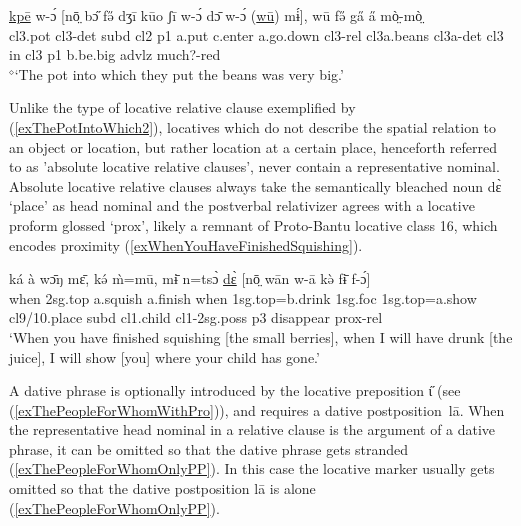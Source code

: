 \documentclass[10pt,twoside]{article}
\def\ci#1{{\ipaFont #1}}
\newcommand{\gl}[1]{`#1'}
\def\VSP{\vspace{0pt}}
\newcommand{\cl}[1]{{\sc cl#1}}
\newcommand{\pref}[1]{(\ref{#1})}
\def\elicited{$^\diamond$}
\def\ih{ɩ}
\begin{document}
\begin{exe}
	\ex \label{exThePotIntoWhich2}	
		\gll \uline{kpē} w-ɔ́ [nō̤ bɔ̋ fə̋ dʒī kūo ʃī w-ɔ́ dɔ̄ w-ɔ́ (\uline{wū}) mɨ́], wū fə̋ ga̋ a̋ mò̤-mò̤	\\
		\cl3.pot \cl3-{\sc det} {\sc subd} \cl2  {\sc p1} a.put c.enter a.go.down \cl3-{\sc rel} \cl3a.beans \cl3a-{\sc det} \cl3  in \cl3  {\sc p1} b.be.big {\sc advlz} much?-{\sc red} 	\\
		\glt \VSP \elicited \gl{The pot into which they put the beans was very big.}
\end{exe}%

Unlike the type of locative relative clause exemplified by \pref{exThePotIntoWhich2}, locatives which do not describe the spatial relation to an object or location, but rather location at a certain place, henceforth referred to as 'absolute locative 
relative clauses', never contain a representative nominal. Absolute locative 
relative clauses always take the semantically bleached noun \ci{dɛ̀} \gl{place} as head nominal and the 
postverbal relativizer agrees with a locative proform glossed \gl{{\sc prox}}, likely
a remnant of Proto-Bantu locative class 16, which 
encodes proximity \pref{exWhenYouHaveFinishedSquishing}. 

\begin{exe}
	\ex \label{exWhenYouHaveFinishedSquishing} 		
		\gll ká à wɔ̄ŋ mɛ̄, kə́ m̀=mū, mɨ̄ n=tsɔ̀ \uline{dɛ̀} [nō̤ wān w-ā kə̀ fɨ̄ f-ɔ́]	\\
		when	{\sc 2sg.top}	a.squish	a.finish		when	{\sc 1sg.top}=b.drink	{\sc 1sg.foc}	{\sc 1sg.top}=a.show	\cl9/10.place	{\sc subd}			\cl1.child		\cl1-{\sc 2sg.poss}	{\sc p3}	disappear	{\sc prox}-{\sc rel}	\\
		\glt \VSP \gl{When you have finished squishing [the small berries], when I will have drunk [the juice], I will show [you] where your child has gone.}
\end{exe}%

A dative phrase is optionally introduced by the locative preposition \ci{\H\ih} (see \pref{exThePeopleForWhomWithPro}),
and requires a dative postposition~\ci{l\=a}. 
When the representative head nominal in a relative clause is the argument of a dative phrase, it 
can be omitted so that the dative phrase gets stranded \pref{exThePeopleForWhomOnlyPP}. In this 
case the locative marker \ci{{\H\ih}} usually gets omitted so that the dative postposition \ci{lā} 
is alone \pref{exThePeopleForWhomOnlyPP}.
\end{document}
